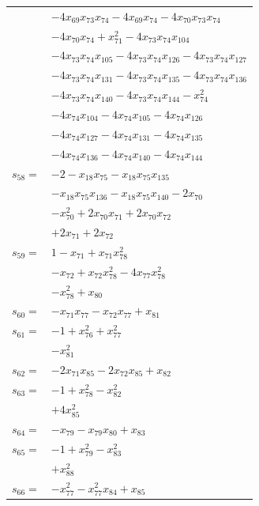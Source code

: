 \begin{longtable}{@{}r@{\;}l@{}}
 & \(\displaystyle -4x_{69}x_{73}x_{74} -4x_{69}x_{74} -4x_{70}x_{73}x_{74}\) \\
 & \(\displaystyle -4x_{70}x_{74} +x_{71}^{2} -4x_{73}x_{74}x_{104}\) \\
 & \(\displaystyle -4x_{73}x_{74}x_{105} -4x_{73}x_{74}x_{126} -4x_{73}x_{74}x_{127}\) \\
 & \(\displaystyle -4x_{73}x_{74}x_{131} -4x_{73}x_{74}x_{135} -4x_{73}x_{74}x_{136}\) \\
 & \(\displaystyle -4x_{73}x_{74}x_{140} -4x_{73}x_{74}x_{144} -x_{74}^{2}\) \\
 & \(\displaystyle -4x_{74}x_{104} -4x_{74}x_{105} -4x_{74}x_{126}\) \\
 & \(\displaystyle -4x_{74}x_{127} -4x_{74}x_{131} -4x_{74}x_{135}\) \\
 & \(\displaystyle -4x_{74}x_{136} -4x_{74}x_{140} -4x_{74}x_{144}\) \\[3pt]
\(s_{58}=\) & \(\displaystyle -2 -x_{18}x_{75} -x_{18}x_{75}x_{135}\) \\
 & \(\displaystyle -x_{18}x_{75}x_{136} -x_{18}x_{75}x_{140} -2x_{70}\) \\
 & \(\displaystyle -x_{70}^{2} +2x_{70}x_{71} +2x_{70}x_{72}\) \\
 & \(\displaystyle +2x_{71} +2x_{72}\) \\[3pt]
\(s_{59}=\) & \(\displaystyle 1 -x_{71} +x_{71}x_{78}^{2}\) \\
 & \(\displaystyle -x_{72} +x_{72}x_{78}^{2} -4x_{77}x_{78}^{2}\) \\
 & \(\displaystyle -x_{78}^{2} +x_{80}\) \\[3pt]
\(s_{60}=\) & \(\displaystyle -x_{71}x_{77} -x_{72}x_{77} +x_{81}\) \\[3pt]
\(s_{61}=\) & \(\displaystyle -1 +x_{76}^{2} +x_{77}^{2}\) \\
 & \(\displaystyle -x_{81}^{2}\) \\[3pt]
\(s_{62}=\) & \(\displaystyle -2x_{71}x_{85} -2x_{72}x_{85} +x_{82}\) \\[3pt]
\(s_{63}=\) & \(\displaystyle -1 +x_{78}^{2} -x_{82}^{2}\) \\
 & \(\displaystyle +4x_{85}^{2}\) \\[3pt]
\(s_{64}=\) & \(\displaystyle -x_{79} -x_{79}x_{80} +x_{83}\) \\[3pt]
\(s_{65}=\) & \(\displaystyle -1 +x_{79}^{2} -x_{83}^{2}\) \\
 & \(\displaystyle +x_{88}^{2}\) \\[3pt]
\(s_{66}=\) & \(\displaystyle -x_{77}^{2} -x_{77}^{2}x_{84} +x_{85}\) \\[3pt]

\end{longtable}
